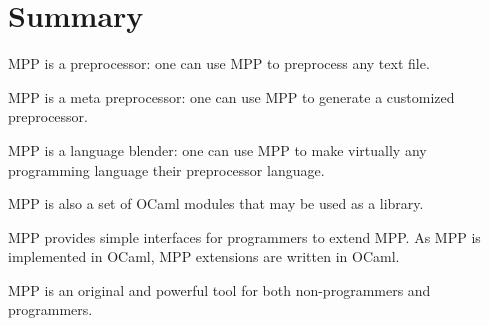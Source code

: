 \documentclass[a4paper]{article}
\begin{document}
\section{Summary}
MPP is a preprocessor: one can use MPP to preprocess any text file.

MPP is a meta preprocessor: one can use MPP to generate a customized preprocessor.

MPP is a language blender: one can use MPP to make virtually any programming language 
their preprocessor language. 

MPP is also a set of OCaml modules that may be used as a library.

MPP provides simple interfaces for programmers to extend MPP. As MPP
is implemented in OCaml, MPP extensions are written in OCaml.  

MPP  is an  original and  powerful tool  for both  non-programmers and
programmers.
\end{document}
